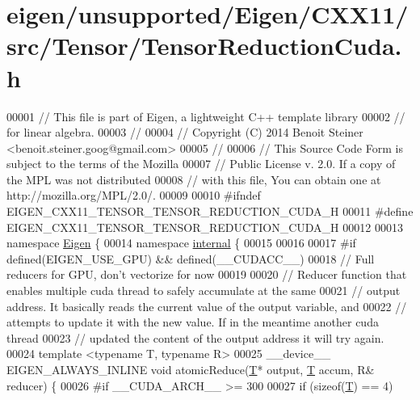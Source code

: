 \hypertarget{eigen_2unsupported_2_eigen_2_c_x_x11_2src_2_tensor_2_tensor_reduction_cuda_8h_source}{}\section{eigen/unsupported/\+Eigen/\+C\+X\+X11/src/\+Tensor/\+Tensor\+Reduction\+Cuda.h}
\label{eigen_2unsupported_2_eigen_2_c_x_x11_2src_2_tensor_2_tensor_reduction_cuda_8h_source}

\begin{DoxyCode}
00001 \textcolor{comment}{// This file is part of Eigen, a lightweight C++ template library}
00002 \textcolor{comment}{// for linear algebra.}
00003 \textcolor{comment}{//}
00004 \textcolor{comment}{// Copyright (C) 2014 Benoit Steiner <benoit.steiner.goog@gmail.com>}
00005 \textcolor{comment}{//}
00006 \textcolor{comment}{// This Source Code Form is subject to the terms of the Mozilla}
00007 \textcolor{comment}{// Public License v. 2.0. If a copy of the MPL was not distributed}
00008 \textcolor{comment}{// with this file, You can obtain one at http://mozilla.org/MPL/2.0/.}
00009 
00010 \textcolor{preprocessor}{#ifndef EIGEN\_CXX11\_TENSOR\_TENSOR\_REDUCTION\_CUDA\_H}
00011 \textcolor{preprocessor}{#define EIGEN\_CXX11\_TENSOR\_TENSOR\_REDUCTION\_CUDA\_H}
00012 
00013 \textcolor{keyword}{namespace }\hyperlink{namespace_eigen}{Eigen} \{
00014 \textcolor{keyword}{namespace }\hyperlink{namespaceinternal}{internal} \{
00015 
00016 
00017 \textcolor{preprocessor}{#if defined(EIGEN\_USE\_GPU) && defined(\_\_CUDACC\_\_)}
00018 \textcolor{comment}{// Full reducers for GPU, don't vectorize for now}
00019 
00020 \textcolor{comment}{// Reducer function that enables multiple cuda thread to safely accumulate at the same}
00021 \textcolor{comment}{// output address. It basically reads the current value of the output variable, and}
00022 \textcolor{comment}{// attempts to update it with the new value. If in the meantime another cuda thread}
00023 \textcolor{comment}{// updated the content of the output address it will try again.}
00024 \textcolor{keyword}{template} <\textcolor{keyword}{typename} T, \textcolor{keyword}{typename} R>
00025 \_\_device\_\_ EIGEN\_ALWAYS\_INLINE \textcolor{keywordtype}{void} atomicReduce(\hyperlink{group___sparse_core___module_class_eigen_1_1_triplet}{T}* output, \hyperlink{group___sparse_core___module_class_eigen_1_1_triplet}{T} accum, R& reducer) \{
00026 \textcolor{preprocessor}{#if \_\_CUDA\_ARCH\_\_ >= 300}
00027   \textcolor{keywordflow}{if} (\textcolor{keyword}{sizeof}(\hyperlink{group___sparse_core___module_class_eigen_1_1_triplet}{T}) == 4)

\end{DoxyCode}
